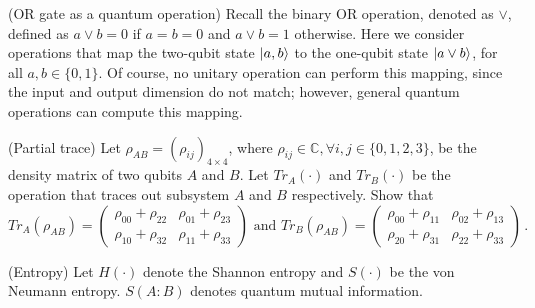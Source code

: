 \begin{questions}
  \question (OR gate as a quantum operation) Recall the binary OR
  operation, denoted as $\vee$, defined as $a \vee b = 0$ if
  $a = b = 0$ and $a\vee b = 1$ otherwise. Here we consider operations
  that map the two-qubit state $\lvert a, b \rangle$ to the one-qubit state
  $\lvert a\vee b \rangle$, for all $a,b \in \{0,1\}$. Of course, no unitary
  operation can perform this mapping, since the input and output
  dimension do not match; however, general quantum operations can
  compute this mapping.


  \question[8] (Partial trace) Let $\rho_{AB} = (\rho_{ij})_{4\times 4}$,
  where $\rho_{ij} \in \mathbb{C},\forall i,j\in \{0,1,2,3\}$, be the
  density matrix of two qubits $A$ and $B$. Let $Tr_A(\cdot)$ and
  $Tr_B(\cdot)$ be the operation that traces out subsystem $A$ and $B$
  respectively. Show that
  \[  Tr_A(\rho_{AB}) = \left(
    \begin{array}{lr}
      \rho_{00} + \rho_{22} & \rho_{01} +\rho_{23}\\
      \rho_{10} + \rho_{32}& \rho_{11} + \rho_{33}
    \end{array} \right) \text{ and } Tr_B(\rho_{AB}) = \left(
    \begin{array}{lr}
      \rho_{00} + \rho_{11} & \rho_{02} +\rho_{13}\\
      \rho_{20} + \rho_{31}& \rho_{22} + \rho_{33}
    \end{array} \right)    \, .\]

  \question (Entropy) Let $H(\cdot)$ denote
  the Shannon entropy and $S(\cdot)$ be the von Neumann
  entropy. $S(A:B)$ denotes quantum mutual information.
  \begin{parts}

\end{parts}
\end{questions}
